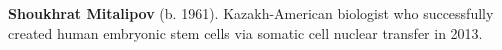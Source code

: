 \textbf{Shoukhrat Mitalipov} (b. 1961). Kazakh-American biologist who successfully created human embryonic stem cells via somatic cell nuclear transfer in 2013.

